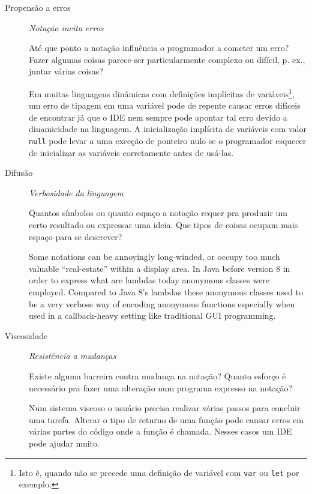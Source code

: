 \begin{description}
\item[{Propensão a erros}] \emph{Notação incita erros}

Até que ponto a notação influência o programador a cometer um erro? Fazer
algumas coisas parece ser particularmente complexo ou difícil, p. ex.,
juntar várias coisas?

Em muitas linguagens dinâmicas com definições implícitas de
variáveis\footnote{Isto é, quando não se precede uma definição de variável
com \texttt{var} ou \texttt{let} por exemplo.}, um erro de tipagem em uma variável pode
de repente causar erros difíceis de encontrar já que o IDE nem sempre
pode apontar tal erro devido a dinamicidade na linguagem. A inicialização
implícita de variáveis com valor \texttt{null} pode levar a uma exceção de
ponteiro nulo se o programador esquecer de inicializar as variáveis
corretamente antes de usá-las.

\item[{Difusão        }]  \emph{Verbosidade da linguagem}

Quantos símbolos ou quanto espaço a notação requer pra produzir um certo
resultado ou expressar uma ideia. Que tipos de coisas ocupam mais espaço
para se descrever?

\begin{citacao}
  Some notations can be annoyingly long-winded, or occupy too much valuable
  “real-estate” within a display area. In Java before version 8 in order to
  express what are lambdas today anonymous classes were employed. Compared to
  Java 8’s lambdas these anonymous classes used to be a very verbose way of
  encoding anonymous functions especially when used in a callback-heavy setting
  like traditional GUI programming.
  \cite[p.~14]{kiss2014}
\end{citacao}

\item[{Viscosidade    }] \emph{Resistência a mudanças}

Existe alguma barreira contra mudança na notação? Quanto esforço é
necessário pra fazer uma alteração num programa expresso na notação?

Num sistema viscoso o usuário precisa realizar várias passos para
concluir uma tarefa. Alterar o tipo de returno de uma função pode causar
erros em várias partes do código onde a função é chamada. Nesses casos um
IDE pode ajudar muito.
\end{description}


